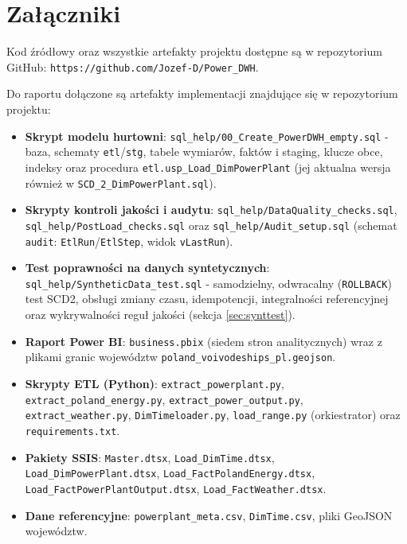 \documentclass[12pt]{article}
\begin{document}
	\section{Załączniki}

	Kod źródłowy oraz wszystkie artefakty projektu dostępne są w repozytorium GitHub: \texttt{https://github.com/Jozef-D/Power\_DWH}.

	\noindent Do raportu dołączone są artefakty implementacji znajdujące się w repozytorium projektu:
	\begin{itemize}
		\item \textbf{Skrypt modelu hurtowni}: \texttt{sql\_help/00\_Create\_PowerDWH\_empty.sql} - baza, schematy \texttt{etl}/\texttt{stg}, tabele wymiarów, faktów i staging, klucze obce, indeksy oraz procedura \texttt{etl.usp\_Load\_DimPowerPlant} (jej aktualna wersja również w \texttt{SCD\_2\_DimPowerPlant.sql}).
		\item \textbf{Skrypty kontroli jakości i audytu}: \texttt{sql\_help/DataQuality\_checks.sql}, \texttt{sql\_help/PostLoad\_checks.sql} oraz \texttt{sql\_help/Audit\_setup.sql} (schemat \texttt{audit}: \texttt{EtlRun}/\texttt{EtlStep}, widok \texttt{vLastRun}).
		\item \textbf{Test poprawności na danych syntetycznych}: \texttt{sql\_help/SyntheticData\_test.sql} - samodzielny, odwracalny (\texttt{ROLLBACK}) test SCD2, obsługi zmiany czasu, idempotencji, integralności referencyjnej oraz wykrywalności reguł jakości (sekcja \ref{sec:synttest}).
		\item \textbf{Raport Power BI}: \texttt{business.pbix} (siedem stron analitycznych) wraz z plikami granic województw \texttt{poland\_voivodeships\_pl.geojson}.
		\item \textbf{Skrypty ETL (Python)}: \texttt{extract\_powerplant.py}, \texttt{extract\_poland\_energy.py}, \texttt{extract\_power\_output.py}, \texttt{extract\_weather.py}, \texttt{DimTimeloader.py}, \texttt{load\_range.py} (orkiestrator) oraz \texttt{requirements.txt}.
		\item \textbf{Pakiety SSIS}: \texttt{Master.dtsx}, \texttt{Load\_DimTime.dtsx}, \texttt{Load\_DimPowerPlant.dtsx}, \texttt{Load\_FactPolandEnergy.dtsx}, \texttt{Load\_FactPowerPlantOutput.dtsx}, \texttt{Load\_FactWeather.dtsx}.
		\item \textbf{Dane referencyjne}: \texttt{powerplant\_meta.csv}, \texttt{DimTime.csv}, pliki GeoJSON województw.
	\end{itemize}
\end{document}
